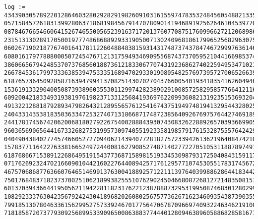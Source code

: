 \documentclass[11pt]{llncs}
\begin{document}
\begin{subappendices}
{\begin{verbatim}
log := 434390305789220128646032802928291982609103161559747835324845605488213355998660010229578378323680044\
0571584572618313992806371868198456791470780901419468919256264610453977016300076786167025822973048136833959\
0878467665466064152674655005652391637172013760770875176099662721206898645595263358736804087462977533382123\
2315131302891705001977748686889293319050071302409681861799652568296307597232351849866431934746650875959245\
0602671902187767401641781122604884838159314317487374378474672999763614677474730173878428493505419425791684\
6080161797788800050724547671213175949346909556874373705952104416698537444077761851591676796872323549138052\
3860665679424853707376856018873612183306770743192368627402259495347102152380263014405374835550410654239197\
2667845361799733363853947533351689470293301908054825769739572700652663971847149309353094674466286132575048\
6187657364509285871639479941370825143070270437660054019341835416260494645090240963521011103532544777046509\
1536191332904005087393896035530112997428238902910085725829585776641211605578600005263072054373393644877392\
6092004218334931938197619823713312568419369762209936082131923515369320441227699207625633325372043664307456\
4913221288187928934798264321289556576125416743751949748194132954432802514401212656718856068337071850239970\
2404331435381835036334725327407131866871748723856409267697576442746918982975062281036365566776392363298081\
2441781745674206200681802792267540028884393074308326228892657039366990569450742219627256186766938021938287\
9603656906564416733268275319957309740551923358198579176153287555764242904421472114283709899984255314466433\
0404904384027745746605272709406214394077281827572339426136219640847421087300602695383542220029909328375886\
1578377116422763381665249724400816279085274871402772270510531188789749167205672072687459257990843335596742\
6187686671538912268649519154377368715898151933453098793172504084315911799081035232913127062198736711334781\
0717626923247021660901044216022764408942571761295771074530551783174567208344889504350258107462608534235119\
4675706868776366076465146991376300418892571221113976403998862864418344276135357701865874422973325150079746\
7501768483718237370025106218993825551076290245046680872681272148350815794759887912260683290899795915060880\
6013703943664419505621194228118231762212387888732953199508746830128029948251456319475543776092009178577716\
1082923337630423567924243041896820260802567577362671623460935438739035558414434183224164944201556049287907\
7991851307804633615629952757339246701775647067870966974093224634621910071023645348714835033340680626583962\
7181858720737793092568995339096500863883774440128094638960588682858167109320517538894030840557729910897452\

\end{verbatim}}
\end{subappendices}
\end{document}
